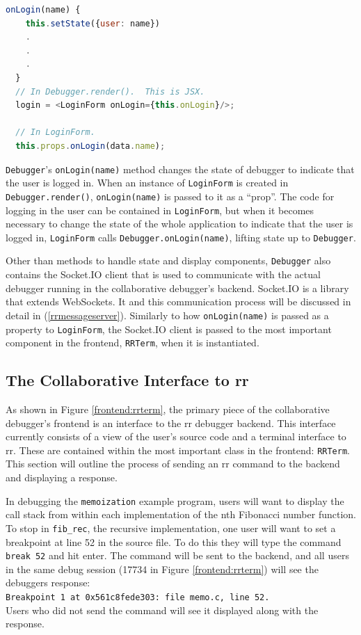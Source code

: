 \documentclass[12pt]{article}
\begin{document}
\begin{lstlisting}[language=Javascript,basicstyle=\linespread{0.5}\ttfamily,caption={Lifting State Up},captionpos=b]
  onLogin(name) {
    this.setState({user: name})
    .
    .
    .
  }
  // In Debugger.render().  This is JSX.
  login = <LoginForm onLogin={this.onLogin}/>;
  
  // In LoginForm.
  this.props.onLogin(data.name);
\end{lstlisting}

\lstinline{Debugger}'s \lstinline{onLogin(name)} method changes the
state of debugger to indicate that the user is logged in.  When an
instance of \lstinline{LoginForm} is created in
\lstinline{Debugger.render()}, \lstinline{onLogin(name)} is passed to
it as a ``prop''.  The code for logging in the user can be contained
in \lstinline{LoginForm}, but when it becomes necessary to change the
state of the whole application to indicate that the user is logged in,
\lstinline{LoginForm} calls \lstinline{Debugger.onLogin(name)},
lifting state up to \lstinline{Debugger}.
\par

Other than methods to handle state and display components,
\lstinline{Debugger} also contains the Socket.IO client that is used
to communicate with the actual debugger running in the collaborative
debugger's backend.  Socket.IO is a library that extends WebSockets.
It and this communication process will be discussed in detail in
(\ref{rrmessageserver}).  Similarly to how \lstinline{onLogin(name)}
is passed as a property to \lstinline{LoginForm}, the Socket.IO client
is passed to the most important component in the frontend,
\lstinline{RRTerm}, when it is instantiated.

\subsection{The Collaborative Interface to rr}

As shown in Figure \ref{frontend:rrterm}, the primary piece of the
collaborative debugger's frontend is an interface to the rr debugger
backend.  This interface currently consists of a view of the user's
source code and a terminal interface to rr.  These are contained
within the most important class in the frontend: \lstinline{RRTerm}.
This section will outline the process of sending an rr command to the
backend and displaying a response.
\par

In debugging the \lstinline{memoization} example program, users will
want to display the call stack from within each implementation of the
nth Fibonacci number function.  To stop in \lstinline{fib_rec}, the
recursive implementation, one user will want to set a breakpoint at
line 52 in the source file.  To do this they will type the command
\lstinline{break 52} and hit enter.  The command will be sent to the
backend, and all users in the same debug session (17734 in Figure
\ref{frontend:rrterm}) will see the debuggers response:\\
\lstinline{Breakpoint 1 at 0x561c8fede303: file memo.c, line 52.}\\
Users who did not send the command will see it displayed along with
the response.
\end{document}
